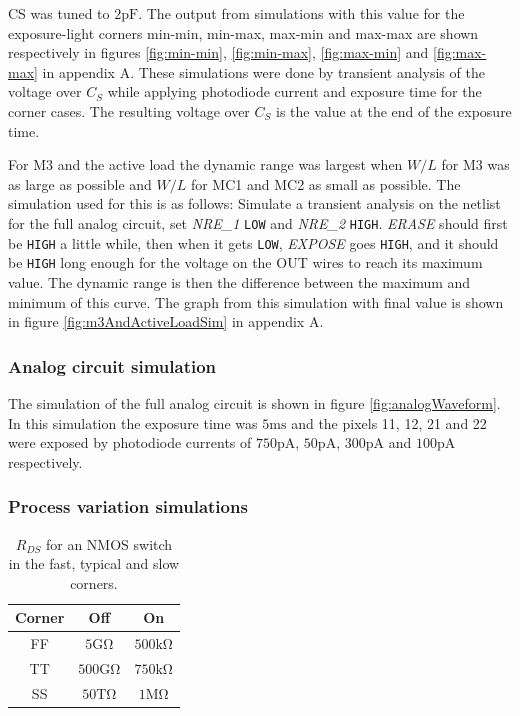 CS was tuned to $2 \mathrm{pF}$. The output from simulations with this value for the exposure-light corners min-min, min-max, max-min and max-max are shown respectively in figures \ref{fig:min-min}, \ref{fig:min-max}, \ref{fig:max-min} and \ref{fig:max-max} in appendix A. These simulations were done by transient analysis of the voltage over $C_S$ while applying photodiode current and exposure time for the corner cases. The resulting voltage over $C_S$ is the value at the end of the exposure time.

For M3 and the active load the dynamic range was largest when $W/L$ for M3 was as large as possible and $W/L$ for MC1 and MC2 as small as possible. The simulation used for this is as follows: Simulate a transient analysis on the netlist for the full analog circuit, set \emph{NRE\_1} \verb|LOW| and \emph{NRE\_2} \verb|HIGH|. \emph{ERASE} should first be \verb|HIGH| a little while, then when it gets \verb|LOW|, \emph{EXPOSE} goes \verb|HIGH|, and it should be \verb|HIGH| long enough for the voltage on the OUT wires to reach its maximum value. The dynamic range is then the difference between the maximum and minimum of this curve. The graph from this simulation with final value is shown in figure \ref{fig:m3AndActiveLoadSim} in appendix A.

\subsubsection{Analog circuit simulation}

The simulation of the full analog circuit is shown in figure \ref{fig:analogWaveform}. In this simulation the exposure time was $5 \mathrm{ms}$ and the pixels 11, 12, 21 and 22 were exposed by photodiode currents of $750 \mathrm{pA}$, $50 \mathrm{pA}$, $300 \mathrm{pA}$ and $100 \mathrm{pA}$ respectively.

\subsubsection{Process variation simulations}

\begin{table}[H]
    \centering
    \caption{$R_{DS}$ for an NMOS switch in the fast, typical and slow corners.}
    \label{tab:corners}
    \begin{tabular}{|c|c|c|}
        \hline
        Corner & Off & On \\
        \hline
        FF & $5 \mathrm{G\Omega}$ & $500 \mathrm{k\Omega}$ \\
        TT & $500 \mathrm{G\Omega}$ & $750 \mathrm{k\Omega}$ \\
        SS & $50 \mathrm{T\Omega}$ & $1 \mathrm{M\Omega}$ \\
        \hline
    \end{tabular}
\end{table}

